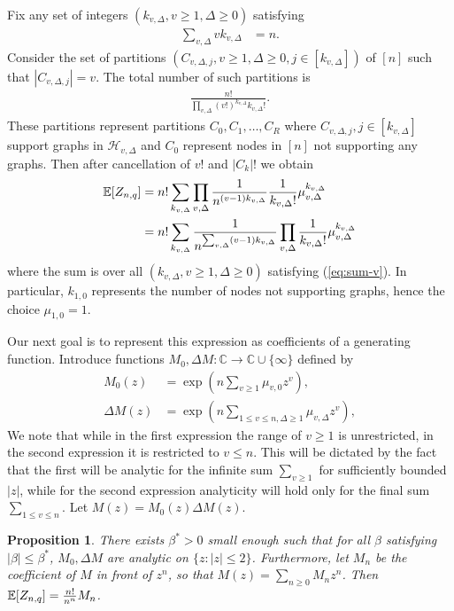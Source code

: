 \documentclass[12pt]{article}
\newtheorem{proposition}[theorem]{Proposition}
\newcommand{\E}{\mathbb{E}}
\newcommand{\C}{\mathbb{C}}
\newcommand{\cH}{\mathcal{H}}
\begin{document}
Fix any set of integers $(k_{v,\Delta}, v\ge 1,\Delta\ge 0)$ satisfying
\begin{align}
\sum_{v,\Delta} vk_{v,\Delta}&=n \label{eq:sum-v}.
\end{align} 
Consider the set of  partitions $(C_{v,\Delta,j},v\ge 1,\Delta\ge 0, j\in [k_{v,\Delta}])$  of $[n]$ such that $|C_{v,\Delta,j}|=v$.  
The total number of such partitions is 
\begin{align}
    \frac{n!}{\prod_{v,\Delta}(v!)^{k_{v,\Delta}} k_{v,\Delta}!}.
\end{align}
These partitions represent partitions $C_0,C_1,\ldots,C_R$ where 
$C_{v,\Delta,j}, j\in [k_{v,\Delta}]$ support graphs in $\cH_{v,\Delta}$ and $C_0$
represent nodes in $[n]$ not supporting any graphs. 
Then after cancellation of $v!$ and $|C_k|!$ we obtain
\begin{align}
\E[Z_{n,q}]  &=n!\sum_{k_{v,\Delta}}\prod_{v,\Delta}{1\over n^{(v-1)k_{v,\Delta}}}{1\over k_{v,\Delta}!}\mu_{v,\Delta}^{k_{v,\Delta}} \notag \\
&=n!\sum_{k_{v,\Delta}}{1\over n^{\sum_{v,\Delta}(v-1)k_{v,\Delta}}}\prod_{v,\Delta}{1\over k_{v,\Delta}!}\mu_{v,\Delta}^{k_{v,\Delta}} \label{eq:sum-k-v}
\end{align}
where the sum is over all $(k_{v,\Delta}, v\ge 1, \Delta\ge 0)$ satisfying (\ref{eq:sum-v}). In particular, $k_{1,0}$ represents the number of nodes
not supporting graphs, hence the choice $\mu_{1,0}=1$.


Our next goal is to represent this expression as coefficients of a generating function. 
 Introduce functions $M_0,\Delta M:\C\to \C \cup \{\infty\}$ defined by
\begin{align*}
M_0(z)&=\exp\left(n \sum_{v\ge 1}\mu_{v,0}z^{v}\right), \\
\Delta M(z)&=\exp\left(n \sum_{1\le v\le n,\Delta\ge 1}\mu_{v,\Delta}z^{v}\right),
\end{align*}
We note that while in the first expression the range of $v\ge 1$ is unrestricted, in the second expression it is restricted to $v\le n$. 
This will be dictated by the fact that the first will be analytic for the infinite sum $\sum_{v\ge 1}$ for sufficiently bounded $|z|$, while for the second expression analyticity will hold  only for the final 
sum $\sum_{1\le v\le n}$. Let $M(z)=M_0(z)\Delta M(z)$.
\begin{proposition}\label{prop:generating-expansion}
There exists $\beta^*>0$ small enough such that for all $\beta$ satisfying $|\beta|\le \beta^*$,  $M_0,\Delta M$ are analytic on $\{z: |z|\le 2\}$.
Furthermore, let $M_n$ be the coefficient of $M$ in front of $z^n$, so that $M(z)=\sum_{n\ge 0}M_nz^n$. Then $\E[Z_{n,q}]={n!  \over n^n}M_n$.
\end{proposition}
\end{document}

